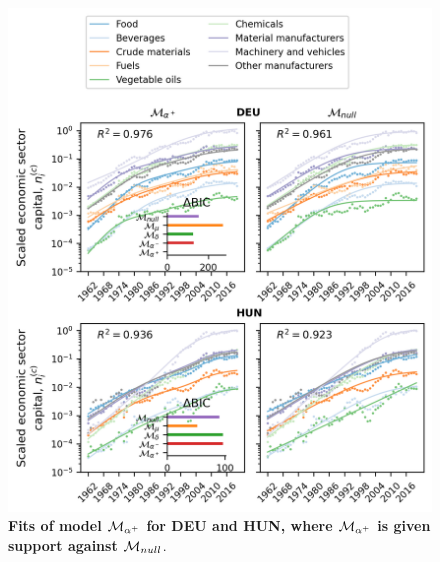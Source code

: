 \FloatBarrier
\begin{figure}
  \center
  \includegraphics{figures/SI/figure_alphap_simulate.png}
  \caption{\small \textbf{Fits of model $\mathcal{M}_{\alpha^+}$ for DEU and HUN, where $\mathcal{M}_{\alpha^+}$ is given support against $\mathcal{M}_{null}$}. 
   }\label{figSI:fit_alphap}
\end{figure}

